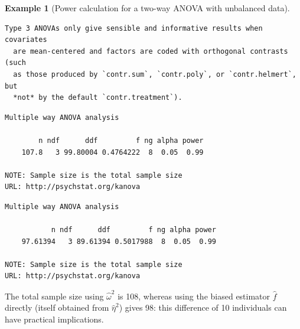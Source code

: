 \documentclass[
  11pt,
  letterpaper,
]{scrbook}
\theoremstyle{definition}
\theoremstyle{definition}
\newtheorem{example}{Example}[chapter]
\theoremstyle{remark}
\begin{document}
\begin{example}[Power calculation for a two-way ANOVA with unbalanced
data]
\begin{verbatim}
Type 3 ANOVAs only give sensible and informative results when covariates
  are mean-centered and factors are coded with orthogonal contrasts (such
  as those produced by `contr.sum`, `contr.poly`, or `contr.helmert`, but
  *not* by the default `contr.treatment`).
\end{verbatim}

\begin{verbatim}
Multiple way ANOVA analysis

        n ndf      ddf         f ng alpha power
    107.8   3 99.80004 0.4764222  8  0.05  0.99

NOTE: Sample size is the total sample size
URL: http://psychstat.org/kanova
\end{verbatim}

\begin{verbatim}
Multiple way ANOVA analysis

           n ndf      ddf         f ng alpha power
    97.61394   3 89.61394 0.5017988  8  0.05  0.99

NOTE: Sample size is the total sample size
URL: http://psychstat.org/kanova
\end{verbatim}

The total sample size using \(\widehat{\omega}^2\) is 108, whereas using
the biased estimator \(\widehat{f}\) directly (itself obtained from
\(\widehat{\eta}^2\)) gives 98: this difference of 10 individuals can
have practical implications.

\end{example}
\end{document}
